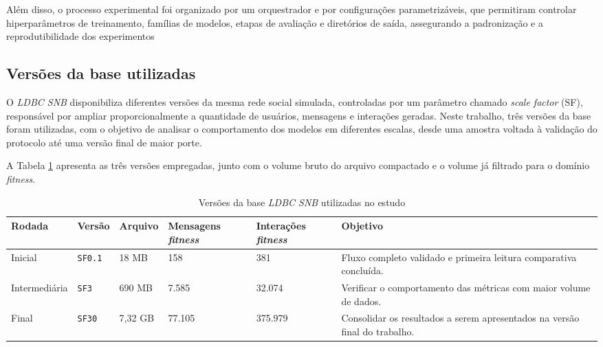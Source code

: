 \documentclass[a4paper,12pt]{article}
\begin{document}
Além disso, o processo experimental foi organizado por um orquestrador e por configurações parametrizáveis, que permitiram controlar hiperparâmetros de treinamento, famílias de modelos, etapas de avaliação e diretórios de saída, assegurando a padronização e a reprodutibilidade dos experimentos

\subsection{Versões da base utilizadas}
\label{subsec:versoes_base}

O \textit{LDBC SNB} disponibiliza diferentes versões da mesma rede social simulada, controladas por um parâmetro chamado \textit{scale factor} (SF), responsável por ampliar proporcionalmente a quantidade de usuários, mensagens e interações geradas. Neste trabalho, três versões da base foram utilizadas, com o objetivo de analisar o comportamento dos modelos em diferentes escalas, desde uma amostra voltada à validação do protocolo até uma versão final de maior porte.

A Tabela \ref{tab:rodadas_execucao_tcc} apresenta as três versões empregadas, junto com o volume bruto do arquivo compactado e o volume já filtrado para o domínio \textit{fitness}.

\begin{table}[H]
\centering
\caption{Versões da base \textit{LDBC SNB} utilizadas no estudo}
\label{tab:rodadas_execucao_tcc}
\small
\begin{tabular}{|p{2.0cm}|p{1.2cm}|p{1.4cm}|p{1.8cm}|p{1.8cm}|p{3.7cm}|}
\hline
\textbf{Rodada} & \textbf{Versão} & \textbf{Arquivo} & \textbf{Mensagens \textit{fitness}} & \textbf{Interações \textit{fitness}} & \textbf{Objetivo} \\
\hline
Inicial & \texttt{SF0.1} & 18 MB & 158 & 381 & Fluxo completo validado e primeira leitura comparativa concluída. \\
\hline
Intermediária & \texttt{SF3} & 690 MB & 7.585 & 32.074 & Verificar o comportamento das métricas com maior volume de dados. \\
\hline
Final & \texttt{SF30} & 7,32 GB & 77.105 & 375.979 & Consolidar os resultados a serem apresentados na versão final do trabalho. \\
\hline
\end{tabular}
\end{table}
\end{document}
